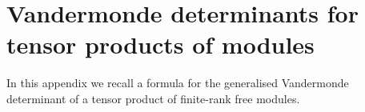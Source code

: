 \documentclass[a4paper,10pt]{amsart}
\theoremstyle{definition}
\theoremstyle{remark}
\newtheorem{rem}[thm]{Remark}
\numberwithin{equation}{section}
\newcommand{\Q}{\mathbb Q}
\newcommand{\R}{\mathbb R}
\newcommand{\rec}{\mathrm{rec}}
\newcommand{\ts}{\mathrm{Sup}}
\newcommand{\0}{\color{blue}{\mathsf{0}}}
\begin{document}


   
  

  
  
  
  
  
  
  
  

   \appendix 
   \section{Vandermonde determinants for tensor products of modules}  \label{sect: Appendix} In this appendix we recall  a formula   \cite{BrVdM}  for the generalised Vandermonde determinant  of a tensor product of finite-rank free modules.    
\end{document}
